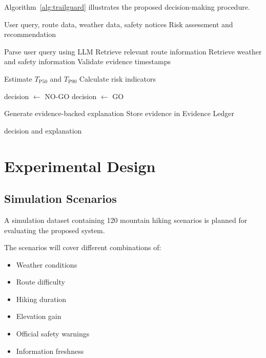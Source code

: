 \documentclass[conference]{IEEEtran}
\begin{document}
Algorithm~\ref{alg:trailguard} illustrates the proposed
decision-making procedure.

\begin{algorithm}[!t]
\caption{TrailGuard TW Risk Assessment}
\label{alg:trailguard}
\begin{algorithmic}[1]
\Require User query, route data, weather data, safety notices
\Ensure Risk assessment and recommendation

\State Parse user query using LLM
\State Retrieve relevant route information
\State Retrieve weather and safety information
\State Validate evidence timestamps

\State Estimate $T_{\mathrm{P50}}$ and $T_{\mathrm{P90}}$
\State Calculate risk indicators

    \State decision $\gets$ NO-GO
\Else
    \State decision $\gets$ GO
\EndIf

\State Generate evidence-backed explanation
\State Store evidence in Evidence Ledger

\Return decision and explanation
\end{algorithmic}
\end{algorithm}

\section{Experimental Design}

\subsection{Simulation Scenarios}

A simulation dataset containing 120 mountain hiking scenarios
is planned for evaluating the proposed system.

The scenarios will cover different combinations of:

\begin{itemize}
    \item Weather conditions
    \item Route difficulty
    \item Hiking duration
    \item Elevation gain
    \item Official safety warnings
    \item Information freshness
\end{itemize}
\end{document}
